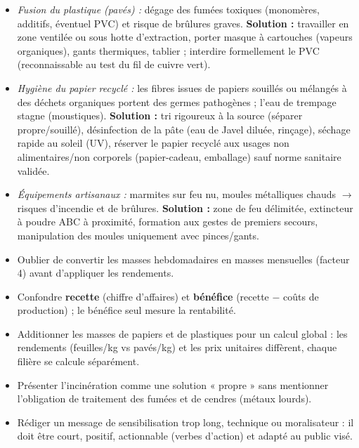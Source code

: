 \documentclass[11pt]{article}
\begin{document}
\begin{exoresolu}
\begin{itemize}
\item \emph{Fusion du plastique (pavés) :} dégage des fumées toxiques (monomères, additifs, éventuel PVC) et risque de brûlures graves. \textbf{Solution :} travailler en zone ventilée ou sous hotte d'extraction, porter masque à cartouches (vapeurs organiques), gants thermiques, tablier ; interdire formellement le PVC (reconnaissable au test du fil de cuivre vert).
\item \emph{Hygiène du papier recyclé :} les fibres issues de papiers souillés ou mélangés à des déchets organiques portent des germes pathogènes ; l'eau de trempage stagne (moustiques). \textbf{Solution :} tri rigoureux à la source (séparer propre/souillé), désinfection de la pâte (eau de Javel diluée, rinçage), séchage rapide au soleil (UV), réserver le papier recyclé aux usages non alimentaires/non corporels (papier-cadeau, emballage) sauf norme sanitaire validée.
\item \emph{Équipements artisanaux :} marmites sur feu nu, moules métalliques chauds $\rightarrow$ risques d'incendie et de brûlures. \textbf{Solution :} zone de feu délimitée, extincteur à poudre ABC à proximité, formation aux gestes de premiers secours, manipulation des moules uniquement avec pinces/gants.
\end{itemize}
\end{exoresolu}

\begin{attention}
\begin{itemize}
\item Oublier de convertir les masses hebdomadaires en masses mensuelles (facteur 4) avant d'appliquer les rendements.
\item Confondre \textbf{recette} (chiffre d'affaires) et \textbf{bénéfice} (recette $-$ coûts de production) ; le bénéfice seul mesure la rentabilité.
\item Additionner les masses de papiers et de plastiques pour un calcul global : les rendements (feuilles/kg vs pavés/kg) et les prix unitaires diffèrent, chaque filière se calcule séparément.
\item Présenter l'incinération comme une solution « propre » sans mentionner l'obligation de traitement des fumées et de cendres (métaux lourds).
\item Rédiger un message de sensibilisation trop long, technique ou moralisateur : il doit être court, positif, actionnable (verbes d'action) et adapté au public visé.
\end{itemize}
\end{attention}
\end{document}
